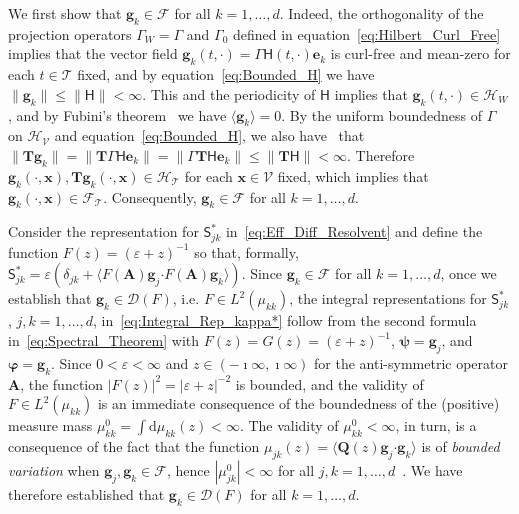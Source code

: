 \documentclass[leqno,onefignum,onetabnum]{siamltex1213}
\renewcommand{\d}{\mathrm{d}}
\newcommand{\Tb}{\mathbf{T}}
\newcommand{\Ab}{\mathbf{A}}
\newcommand{\Qb}{\mathbf{Q}}
\newcommand{\Tc}{\mathcal{T}}
\newcommand{\Vc}{\mathcal{V}}
\newcommand{\Hc}{\mathcal{H}}
\newcommand{\Fc}{\mathcal{F}}
\newcommand{\Hm}{\mathsf{H}}
\newcommand{\Sm}{\mathsf{S}}
\newcommand{\Ds}{\mathscr{D}}
\providecommand\bcdot{\boldsymbol{\cdot}}
\newcommand{\vecg}{\boldsymbol{g}}
\newcommand{\vecx}{\boldsymbol{x}}
\newcommand{\vece}{\boldsymbol{e}}
\newcommand{\vecpsi}{\boldsymbol{\psi}}
\newcommand{\vecvarphi}{\boldsymbol{\varphi}}
\begin{document}
We first show that $\vecg_k\in\Fc$ for
all $k=1,\ldots,d$. Indeed, the orthogonality of the
projection operators $\Gamma_W=\Gamma$ and $\Gamma_0$ defined in
equation~\eqref{eq:Hilbert_Curl_Free} implies that the vector field
$\vecg_k(t,\cdot)=\Gamma\Hm(t,\cdot)\vece _k$ is curl-free and mean-zero
for each $t\in\Tc$ fixed, and by equation~\eqref{eq:Bounded_H} 
we have $\|\vecg_k\|\leq\|\Hm\|<\infty$. This and the periodicity of $\Hm$ implies
that $\vecg_k(t,\cdot)\in\Hc_W$, and by Fubini's theorem~\cite{Folland:99:RealAnalysis}
we have $\langle\vecg_k\rangle=0$.  By the uniform boundedness of $\Gamma$ on
$\Hc_{\Vc}$ and equation~\eqref{eq:Bounded_H}, we also
have~\cite{Folland:99:RealAnalysis} that 
$\|\Tb\vecg_k\|=\|\Tb\Gamma\Hm\vece _k\|=\|\Gamma\Tb\Hm\vece _k\|\leq\|\Tb\Hm\|<\infty$.   
Therefore $\vecg_k(\cdot,\vecx),\Tb\vecg_k(\cdot,\vecx)\in\Hc_{\Tc}$ for each
$\vecx\in\Vc$ fixed, which implies that
$\vecg_k(\cdot,\vecx)\in\Fc_{\Tc}$. Consequently,  $\vecg_k\in\Fc$ for
all $k=1,\ldots,d$.



Consider the representation for $\Sm^*_{jk}$
in~\eqref{eq:Eff_Diff_Resolvent} and define the function 
$F(z)=(\varepsilon+z)^{-1}$ so that, formally,
$\Sm^*_{jk}=\varepsilon(\delta_{jk}+\langle F(\Ab)\vecg_j\bcdot F(\Ab)\vecg_k\rangle)$. Since
$\vecg_k\in\Fc$ for all $k=1,\ldots,d$, once we establish that
$\vecg_k\in\Ds(F)$, i.e. $F\in L^2(\mu_{kk})$, the integral representations
for $\Sm^*_{jk}$, $j,k=1,\ldots,d$, in~\eqref{eq:Integral_Rep_kappa*} follow
from the second formula in~\eqref{eq:Spectral_Theorem} with
$F(z)=G(z)=(\varepsilon+z)^{-1}$, $\vecpsi=\vecg_j$, and
$\vecvarphi=\vecg_k$. Since $0<\varepsilon<\infty$ and 
$z\in(-\imath\infty,\imath\infty)$ for the anti-symmetric operator $\Ab$, the function
$|F(z)|^2=|\varepsilon+z|^{-2}$ is bounded, and the validity of $F\in L^2(\mu_{kk})$ is
an immediate consequence of the boundedness of the (positive) measure
mass $\mu^0_{kk}=\int\d\mu_{kk}(z)<\infty$. The validity of $\mu^0_{kk}<\infty$, in turn,
is a consequence of the fact that the function
$\mu_{jk}(z)=\langle\Qb(z)\vecg_j\bcdot\vecg_k\rangle$ is of \emph{bounded
  variation} when $\vecg_j,\vecg_k\in\Fc$, hence
$|\mu^0_{jk}|<\infty$ for all $j,k=1,\ldots,d$~\cite{Stone:64}. We have therefore
established that $\vecg_k\in\Ds(F)$ for all $k=1,\ldots,d$.     
\end{document}
